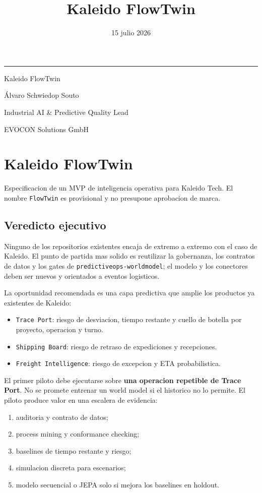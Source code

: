 \documentclass[
  spanish,
  10pt,
  a4paper,
]{article}
\title{Kaleido FlowTwin}
\author{}
\date{15 julio 2026}
\makeatletter
\providecommand{\tightlist}{%
  \setlength{\itemsep}{0pt}\setlength{\parskip}{0pt}}
\renewcommand{\maketitle}{%
  \hypersetup{pageanchor=false}
  \begin{titlepage}
    \pagecolor{KaleidoNavy}
    \color{white}
    \vspace*{1.4cm}
    {\color{KaleidoCyan}\rule{2.4cm}{2.5pt}\par}
    \vspace{1.1cm}
    {\Huge\bfseries\@title\par}
    \vspace{0.65cm}
    {\Large\color{KaleidoMint}Kaleido FlowTwin\par}
    \vfill
    {\large Álvaro Schwiedop Souto\par}
    \vspace{0.15cm}
    {\normalsize\color{KaleidoMint}Industrial AI \& Predictive Quality Lead\par}
    \vspace{0.15cm}
    {\normalsize\color{KaleidoMint}EVOCON Solutions GmbH\par}
    \vspace{0.25cm}
    {\normalsize\color{KaleidoMint}\@date\par}
  \end{titlepage}
  \hypersetup{pageanchor=true}
  \nopagecolor
  \color{black}
}
\makeatother
\begin{document}
\maketitle

{
\setcounter{tocdepth}{3}
\tableofcontents
}
\section{Kaleido FlowTwin}\label{kaleido-flowtwin}

Especificacion de un MVP de inteligencia operativa para Kaleido Tech. El
nombre \texttt{FlowTwin} es provisional y no presupone aprobacion de
marca.

\subsection{Veredicto ejecutivo}\label{veredicto-ejecutivo}

Ninguno de los repositorios existentes encaja de extremo a extremo con
el caso de Kaleido. El punto de partida mas solido es reutilizar la
gobernanza, los contratos de datos y los gates de
\texttt{predictiveops-worldmodel}; el modelo y los conectores deben ser
nuevos y orientados a eventos logisticos.

La oportunidad recomendada es una capa predictiva que amplie los
productos ya existentes de Kaleido:

\begin{itemize}
\tightlist
\item
  \texttt{Trace\ Port}: riesgo de desviacion, tiempo restante y cuello
  de botella por proyecto, operacion y turno.
\item
  \texttt{Shipping\ Board}: riesgo de retraso de expediciones y
  recepciones.
\item
  \texttt{Freight\ Intelligence}: riesgo de excepcion y ETA
  probabilistica.
\end{itemize}

El primer piloto debe ejecutarse sobre \textbf{una operacion repetible
de Trace Port}. No se promete entrenar un world model si el historico no
lo permite. El piloto produce valor en una escalera de evidencia:

\begin{enumerate}
\def\labelenumi{\arabic{enumi}.}
\tightlist
\item
  auditoria y contrato de datos;
\item
  process mining y conformance checking;
\item
  baselines de tiempo restante y riesgo;
\item
  simulacion discreta para escenarios;
\item
  modelo secuencial o JEPA solo si mejora los baselines en holdout.
\end{enumerate}
\end{document}

